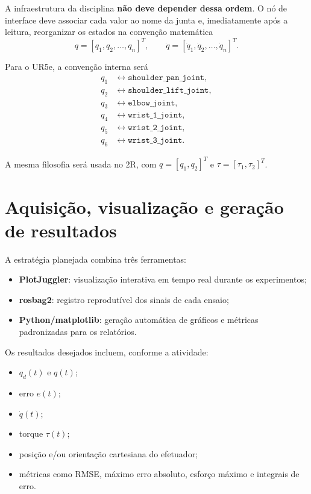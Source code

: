 \documentclass[11pt,a4paper]{article}
\begin{document}
A infraestrutura da disciplina \textbf{não deve depender dessa ordem}. O nó de interface deve associar cada valor ao nome da junta e, imediatamente após a leitura, reorganizar os estados na convenção matemática
\begin{equation}
q = [q_1,q_2,\ldots,q_n]^T,\qquad
\dot q = [\dot q_1,\dot q_2,\ldots,\dot q_n]^T.
\end{equation}

Para o UR5e, a convenção interna será
\begin{align*}
q_1 &\leftrightarrow \texttt{shoulder\_pan\_joint},\\
q_2 &\leftrightarrow \texttt{shoulder\_lift\_joint},\\
q_3 &\leftrightarrow \texttt{elbow\_joint},\\
q_4 &\leftrightarrow \texttt{wrist\_1\_joint},\\
q_5 &\leftrightarrow \texttt{wrist\_2\_joint},\\
q_6 &\leftrightarrow \texttt{wrist\_3\_joint}.
\end{align*}

A mesma filosofia será usada no 2R, com $q=[q_1,q_2]^T$ e $\tau=[\tau_1,\tau_2]^T$.

\section{Aquisição, visualização e geração de resultados}

A estratégia planejada combina três ferramentas:
\begin{itemize}
  \item \textbf{PlotJuggler}: visualização interativa em tempo real durante os experimentos;
  \item \textbf{rosbag2}: registro reprodutível dos sinais de cada ensaio;
  \item \textbf{Python/matplotlib}: geração automática de gráficos e métricas padronizadas para os relatórios.
\end{itemize}

Os resultados desejados incluem, conforme a atividade:
\begin{itemize}
  \item $q_d(t)$ e $q(t)$;
  \item erro $e(t)$;
  \item $\dot q(t)$;
  \item torque $\tau(t)$;
  \item posição e/ou orientação cartesiana do efetuador;
  \item métricas como RMSE, máximo erro absoluto, esforço máximo e integrais de erro.
\end{itemize}
\end{document}
